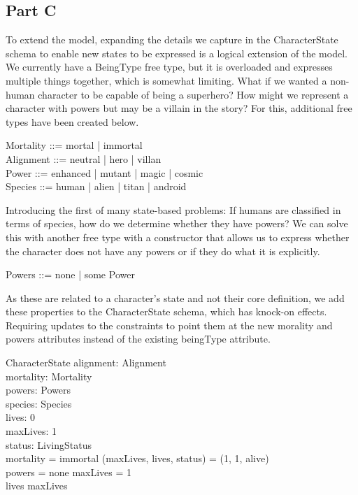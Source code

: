 \documentclass{article}
\begin{document}
\subsection*{Part C}

To extend the model, expanding the details we capture in the CharacterState schema to enable new states to be expressed is a logical extension of the model. We currently have a BeingType free type, but it is overloaded and expresses multiple things together, which is somewhat limiting. What if we wanted a non-human character to be capable of being a superhero? How might we represent a character with powers but may be a villain in the story? For this, additional free types have been created below. 

\begin{zed}
Mortality ::= mortal | immortal \\
Alignment ::= neutral | hero | villan \\
Power ::= enhanced | mutant | magic | cosmic \\
Species ::= human | alien | titan | android \\
\end{zed}

\hspace{-0.68cm} Introducing the first of many state-based problems: If humans are classified in terms of species, how do we determine whether they have powers? We can solve this with another free type with a constructor that allows us to express whether the character does not have any powers or if they do what it is explicitly. 
\begin{zed}
Powers ::= none | some \ldata Power \rdata \\
\end{zed}

\hspace{-0.68cm} As these are related to a character's state and not their core definition, we add these properties to the CharacterState schema, which has knock-on effects. Requiring updates to the constraints to point them at the new morality and powers attributes instead of the existing beingType attribute.

\begin{schema}{CharacterState}
alignment: Alignment \\
mortality: Mortality \\
powers: Powers \\
species: Species \\
lives: 0   \\ 
maxLives: 1  \\ 
status: LivingStatus \\
\where
mortality = immortal \implies (maxLives, lives, status) = (1, 1, alive) \\
powers = none \implies maxLives = 1 \\ 
lives \leq maxLives \\
\end{schema}
\end{document}
